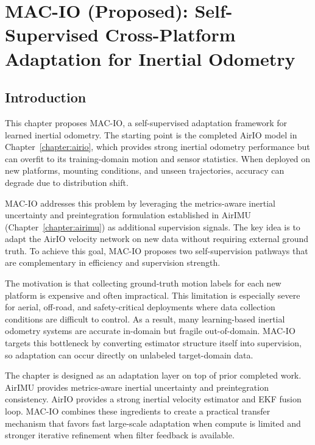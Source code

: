\chapter{MAC-IO (Proposed): Self-Supervised Cross-Platform Adaptation for Inertial Odometry} \label{chapter:macio}

\section{Introduction}

This chapter proposes MAC-IO, a self-supervised adaptation framework for learned inertial odometry.
The starting point is the completed AirIO model in Chapter~\ref{chapter:airio}, which provides strong inertial odometry performance but can overfit to its training-domain motion and sensor statistics.
When deployed on new platforms, mounting conditions, and unseen trajectories, accuracy can degrade due to distribution shift.

MAC-IO addresses this problem by leveraging the metrics-aware inertial uncertainty and preintegration formulation established in AirIMU (Chapter~\ref{chapter:airimu}) as additional supervision signals.
The key idea is to adapt the AirIO velocity network on new data without requiring external ground truth.
To achieve this goal, MAC-IO proposes two self-supervision pathways that are complementary in efficiency and supervision strength.

The motivation is that collecting ground-truth motion labels for each new platform is expensive and often impractical.
This limitation is especially severe for aerial, off-road, and safety-critical deployments where data collection conditions are difficult to control.
As a result, many learning-based inertial odometry systems are accurate in-domain but fragile out-of-domain.
MAC-IO targets this bottleneck by converting estimator structure itself into supervision, so adaptation can occur directly on unlabeled target-domain data.

The chapter is designed as an adaptation layer on top of prior completed work.
AirIMU provides metrics-aware inertial uncertainty and preintegration consistency.
AirIO provides a strong inertial velocity estimator and EKF fusion loop.
MAC-IO combines these ingredients to create a practical transfer mechanism that favors fast large-scale adaptation when compute is limited and stronger iterative refinement when filter feedback is available.

